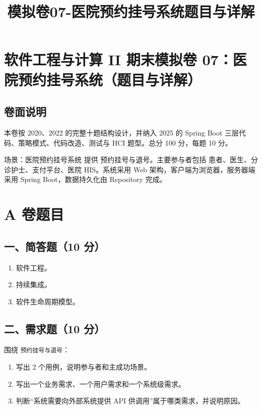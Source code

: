 \documentclass[UTF8,zihao=-4]{ctexart}
\title{模拟卷07-医院预约挂号系统题目与详解}
\author{}
\date{}
\begin{document}
\maketitle
\setcounter{tocdepth}{1}
\tableofcontents
\newpage
\section{软件工程与计算 II 期末模拟卷 07：医院预约挂号系统（题目与详解）}


\subsection{卷面说明}


本卷按 2020、2022 的完整十题结构设计，并纳入 2025 的 Spring Boot 三层代码、策略模式、代码改造、测试与 HCI 题型。总分 100 分，每题 10 分。


场景：医院预约挂号系统 提供 预约挂号与退号。主要参与者包括 患者、医生、分诊护士、支付平台、医院 HIS。系统采用 Web 架构，客户端为浏览器，服务器端采用 Spring Boot，数据持久化由 Repository 完成。


\section{A 卷题目}


\subsection{一、简答题（10 分）}


\begin{enumerate}
\item 软件工程。
\item 持续集成。
\item 软件生命周期模型。
\end{enumerate}


\subsection{二、需求题（10 分）}


围绕 \texttt{预约挂号与退号}：


\begin{enumerate}
\item 写出 2 个用例，说明参与者和主成功场景。
\item 写出一个业务需求、一个用户需求和一个系统级需求。
\item 判断“系统需要向外部系统提供 API 供调用”属于哪类需求，并说明原因。
\end{enumerate}
\end{document}

